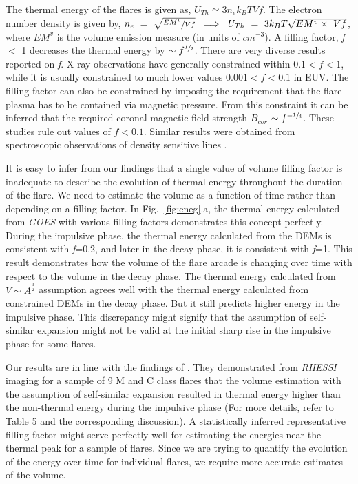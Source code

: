 The thermal energy of the flares is given as, $U_{Th}\simeq 3n_{e}k_{B}TVf$. The electron number density is given by, $n_{e}~=~\sqrt{\sfrac{EM^{v}}{Vf}}~\implies~U_{Th}~=~3k_{B}T\sqrt{EM^{v}\times~Vf}$, where $EM^{v}$ is the volume emission measure (in units of $cm^{-3}$). A filling factor, \textit{f} $<$ 1 decreases the thermal energy by $\sim f^{\sfrac{1}{2}}$. There are very diverse results reported on \textit{f}. X-ray observations have generally constrained within $0.1<\textit{f}<1$\citep{jak11,guo12}, while it is usually constrained to much lower values $0.001<\textit{f}<0.1$ in EUV\citep{ash&ash08}. The filling factor can also be constrained by imposing the requirement that the flare plasma has to be contained via magnetic pressure. From this constraint it can be inferred that the required coronal magnetic field strength $B_{cor}$ $\sim f^{-\sfrac{1}{4}}$\citep{caspi14,warmuth16a,warmuth16b}. These studies rule out values of $\textit{f}<0.1$. Similar results were obtained from spectroscopic observations of density sensitive  lines \citep{miligan12}.

It is easy to infer from our findings that a single value of volume filling factor is inadequate to describe the evolution of thermal energy throughout the duration of the flare. We need to estimate the volume as a function of time rather than depending on a filling factor. In Fig.~\ref{fig:eneg}.a, the thermal energy calculated from {\it GOES} with various filling factors demonstrates this concept perfectly. During the impulsive phase, the thermal energy calculated from the DEMs is consistent with \textit{f}=0.2, and later in the decay phase, it is consistent with \textit{f}=1. This result demonstrates how the volume of the flare arcade is changing over time with respect to the volume in the decay phase. The thermal energy calculated from $V\sim A^{\frac{3}{2}}$ assumption agrees well with the thermal energy calculated from constrained DEMs in the decay phase. But it still predicts higher energy in the impulsive phase. This discrepancy might signify that the assumption of self-similar expansion might not be valid at the initial sharp rise in the impulsive phase for some flares.

Our results are in line with the findings of \cite{hilarie05}. They demonstrated from {\it RHESSI} imaging for a sample of 9 M and C class flares that the volume estimation with the assumption of self-similar expansion resulted in thermal energy higher than the non-thermal energy during the impulsive phase (For more details, refer to \cite{hilarie05} Table 5 and the corresponding discussion). A statistically inferred representative filling factor might serve perfectly well for estimating the energies near the thermal peak for a sample of flares. Since we are trying to quantify the evolution of the energy over time for individual flares, we require more accurate estimates of the volume.

